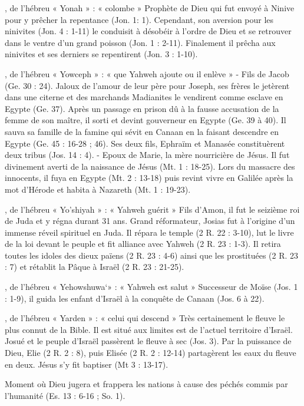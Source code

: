 \begin{multicols}{2}
, de l'hébreu « Yonah » : « colombe »
Prophète de Dieu qui fut envoyé à Ninive pour y prêcher la repentance (Jon. 1: 1). Cependant, son aversion pour les ninivites (Jon. 4 : 1-11) le conduisit à désobéir à l'ordre de Dieu et se retrouver dans le ventre d'un grand poisson (Jon. 1 : 2-11). Finalement il prêcha aux ninivites et ses derniers se repentirent (Jon. 3 : 1-10).


, de l'hébreu « Yowceph » : « que Yahweh ajoute ou il enlève »
- Fils de Jacob (Ge. 30 : 24). Jaloux de l'amour de leur père pour Joseph, ses frères le jetèrent dans une citerne et des marchands Madianites le vendirent comme esclave en Egypte (Ge. 37). Après un passage en prison dû à la fausse accusation de la femme de son maître, il sorti et devint gouverneur en Egypte (Ge. 39 à 40). Il sauva sa famille de la famine qui sévit en Canaan en la faisant descendre en Egypte (Ge. 45 : 16-28 ; 46). Ses deux fils, Ephraïm et Manasée constituèrent deux tribus (Jos. 14 : 4).
- Epoux de Marie, la mère nourricière de Jésus. Il fut divinement averti de la naissance de Jésus (Mt. 1 : 18-25). Lors du massacre des innocents, il fuya en Egypte (Mt. 2 : 13-18) puis revint vivre en Galilée après la mot d'Hérode et habita à Nazareth (Mt. 1 : 19-23).


, de l'hébreu « Yo'shiyah » : « Yahweh guérit »
Fils d'Amon, il fut le seizième roi de Juda et y régna durant 31 ans.
Grand réformateur, Josias fut à l'origine d'un immense réveil spirituel en Juda. Il répara le temple (2 R. 22 : 3-10), lut le livre de la loi devant le peuple et fit alliance avec Yahweh (2 R. 23 : 1-3). Il retira toutes les idoles des dieux païens (2 R. 23 : 4-6) ainsi que les prostituées (2 R. 23 : 7) et rétablit la Pâque à Israël (2 R. 23 : 21-25).


, de l'hébreu « Yehowshuwa`» : « Yahweh est salut »
Successeur de Moïse (Jos. 1 : 1-9), il guida les enfant d'Israël à la conquête de Canaan (Jos. 6 à 22).


, de l'hébreu « Yarden » : « celui qui descend »
Très certainement le fleuve le plus connut de la Bible. Il est situé aux limites est de l'actuel territoire d'Israël. Josué et le peuple d'Israël passèrent le fleuve à sec (Jos. 3).
Par la puissance de Dieu, Elie (2 R. 2 : 8), puis Elisée (2 R. 2 : 12-14) partagèrent les eaux du fleuve en deux. Jésus s'y fit baptiser (Mt 3 : 13-17).


Moment où Dieu jugera et frappera les nations à cause des péchés commis par l'humanité (Es. 13 : 6-16 ; So. 1).



\end{multicols}
